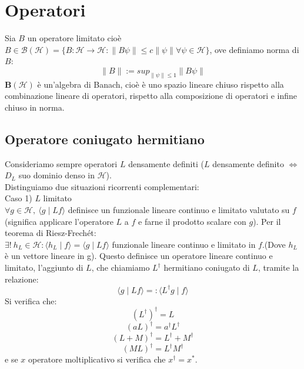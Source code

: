 


%

\section{Operatori} %
Sia $B$ un operatore limitato cioè $B \in \mathcal{B}(\mathcal{H}) =\lbrace B: \mathcal{H} \rightarrow \mathcal{H} : \parallel B\psi\parallel \leq c\parallel \psi \parallel \forall \psi \in \mathcal{H} \rbrace$, ove definiamo norma di $B$:
$$
\parallel B \parallel := sup_{\parallel \psi \parallel \leq 1} \parallel B\psi \parallel
$$
$\textbf {B}(\mathcal{H})$ è un'algebra di Banach, cioè è uno spazio lineare chiuso rispetto alla combinazione lineare di operatori, rispetto alla composizione di operatori e infine chiuso in norma.
\subsection{Operatore coniugato hermitiano}
Consideriamo sempre operatori $L$ densamente definiti ($L$ densamente definito $\Leftrightarrow$ $D_{L}$ suo dominio denso in $\mathcal{H}$).\\
Distinguiamo due situazioni ricorrenti complementari:\\
Caso 1) $L$ limitato\\
$\forall g\in \mathcal{H} ,\ \langle g \mid Lf\rangle $ definisce un funzionale lineare continuo e limitato valutato su $f$ (significa applicare l'operatore $L$ a $f$ e farne il prodotto scalare con $g$). 
Per il teorema di Riesz-Frechét: \\
$\exists ! \ h_{L} \in \mathcal{H} : \langle h_{L} \mid f \rangle = \langle g \mid Lf \rangle$ funzionale lineare continuo e limitato in $f$.(Dove $h_{L}$ è un vettore lineare in g). Questo definisce un operatore lineare continuo e limitato, l'aggiunto di $L$, che chiamiamo $L^{\dag}$ hermitiano coniugato di $L$, tramite la relazione:
$$
\langle g \mid Lf \rangle =: \langle L^{\dag} g \mid f \rangle
$$
Si verifica che:
$$
(L^{\dag})^{\dag} = L
$$ $$
(aL) ^{\dag} = a^{\dag} L^{\dag}
$$ $$
(L + M)^{\dag} = L^{\dag} + M^{\dag}
$$ $$
(ML)^{\dag} = L^{\dag}M^{\dag} $$
e se $x$ operatore moltiplicativo si verifica che $x^{\dag}=x^{*}$.\\

